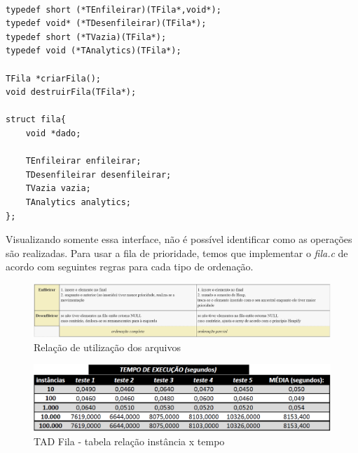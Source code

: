 \documentclass[12pt]{article}
\newcommand{\code}[1]{\emph{#1}}
\begin{document}
\begin{lstlisting}[frame=single]

typedef short (*TEnfileirar)(TFila*,void*);
typedef void* (*TDesenfileirar)(TFila*);
typedef short (*TVazia)(TFila*);
typedef void (*TAnalytics)(TFila*);

TFila *criarFila();
void destruirFila(TFila*);

struct fila{
    void *dado;

    TEnfileirar enfileirar;
    TDesenfileirar desenfileirar;
    TVazia vazia;
    TAnalytics analytics;
};
\end{lstlisting}


Visualizando somente essa interface, não é possível identificar como as operações são realizadas. Para usar a fila de prioridade, temos que implementar o \code{fila.c} de acordo com seguintes regras para cada tipo de ordenação.

\begin{figure}[h!]
\centering
\includegraphics[width=1.1\textwidth]{algoritmo.png}
\caption{Relação de utilização dos arquivos}
\label{fig:relacoes}
\end{figure}


\begin{figure}[h!]
\centering
\includegraphics[width=1.1\textwidth]{tabela_parcial.PNG}
\caption{TAD Fila - tabela relação instância x tempo}
\label{fig:t1}
\end{figure}

\end{document}
